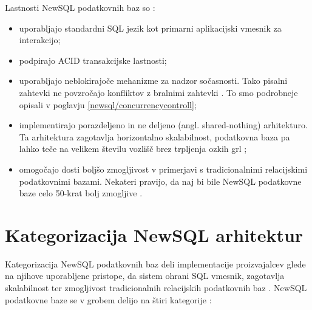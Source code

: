 \documentclass[a4paper, 12pt]{book}
\begin{document}
\noindent Lastnosti NewSQL podatkovnih baz so \cite{Kumar2018Jun}:
\begin{itemize}
    \item uporabljajo standardni SQL jezik kot primarni aplikacijski vmesnik za interakcijo;
    \item podpirajo ACID transakcijske lastnosti;
    \item uporabljajo neblokirajoče mehanizme za nadzor sočasnosti. Tako pisalni zahtevki ne povzročajo konfliktov z bralnimi zahtevki \cite{NewSQLNewWayToHandleBigData}. To smo podrobneje opisali v poglavju \ref{newsql/concurrencycontroll};
    \item implementirajo porazdeljeno in ne deljeno (angl. shared-nothing) arhitekturo. Ta arhitektura zagotavlja horizontalno skalabilnost, podatkovna baza pa lahko teče na velikem številu vozlišč brez trpljenja ozkih grl \cite{NewSQLNewWayToHandleBigData};
    \item omogočajo dosti boljšo zmogljivost v primerjavi s tradicionalnimi relacijskimi podatkovnimi bazami. Nekateri pravijo, da naj bi bile NewSQL podatkovne baze celo 50-krat bolj zmogljive \cite{Kumar2018Jun}.
\end{itemize}

\section{Kategorizacija NewSQL arhitektur}
Kategorizacija NewSQL podatkovnih baz deli implementacije proizvajalcev glede na njihove uporabljene pristope, da sistem ohrani SQL vmesnik, zagotavlja skalabilnost ter zmogljivost tradicionalnih relacijskih podatkovnih baz \cite{NewSQLNewWayToHandleBigData}. NewSQL podatkovne baze se v grobem delijo na štiri kategorije \cite{Mikuletic2015Feb, Pavlo2016Sep}:
\end{document}
